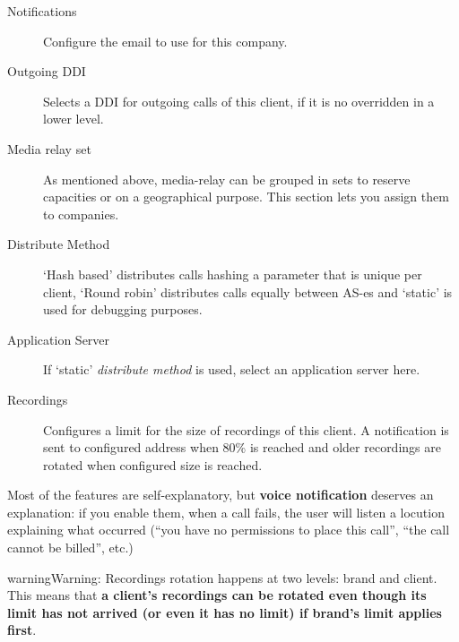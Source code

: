\documentclass[letterpaper,10pt,english]{sphinxmanual}
\begin{document}
\begin{description}
\item[{Notifications}] \leavevmode{}\label{brand/virtual_pbx:term-notifications}
Configure the email {\hyperref[brand/notifications:notification\string-templates]{}} to use for this company.

\item[{Outgoing DDI}] \leavevmode{}\label{brand/virtual_pbx:term-outgoing-ddi}
Selects a DDI for outgoing calls of this client, if it is no overridden in
a lower level.

\item[{Media relay set}] \leavevmode{}\label{brand/virtual_pbx:term-media-relay-set}
As mentioned above, media-relay can be grouped in sets to reserve capacities
or on a geographical purpose. This section lets you assign them to companies.

\item[{Distribute Method}] \leavevmode{}\label{brand/virtual_pbx:term-distribute-method}
`Hash based' distributes calls hashing a parameter that is unique per
client, `Round robin' distributes calls equally between AS-es and
`static' is used for debugging purposes.

\item[{Application Server}] \leavevmode{}\label{brand/virtual_pbx:term-application-server}
If `static' \emph{distribute method} is used, select an application server here.

\item[{Recordings}] \leavevmode{}\label{brand/virtual_pbx:term-recordings}
Configures a limit for the size of recordings of this client. A
notification is sent to configured address when 80\% is reached and
older recordings are rotated when configured size is reached.

\end{description}

Most of the features are self-explanatory, but \textbf{voice notification} deserves
an explanation: if you enable them, when a call fails, the user will listen a
locution explaining what occurred (``you have no permissions to place this call'',
``the call cannot be billed'', etc.)

\begin{notice}{warning}{Warning:}
Recordings rotation happens at two levels: brand and client. This
means that \textbf{a client's recordings can be rotated even though its limit
has not arrived (or even it has no limit) if brand's limit applies first}.
\end{notice}
\end{document}
